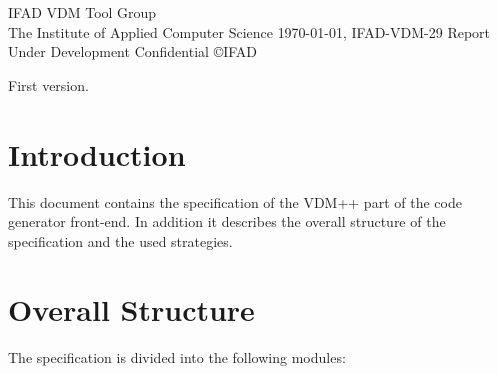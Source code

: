 \documentclass[a4paper,dvips]{article}
\begin{document}

         {IFAD VDM Tool Group \\
          The Institute of Applied Computer Science}
         {\today,}
         {IFAD-VDM-29}
         {Report}
         {Under Development}
         {Confidential}
         {}
         {\copyright IFAD}
         {\item[V1.0] First version.}
         {}


\tableofcontents
\newpage


\section{Introduction}

This document contains the specification
of the VDM++ part of the code generator front-end. In addition
it describes the overall structure of the specification and
the used strategies. 

\section{Overall Structure}

The specification is divided into the following modules:
\end{document}
